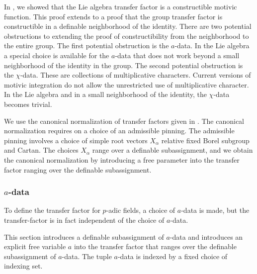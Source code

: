 In \cite{gordon}, we showed that the Lie algebra transfer factor is a constructible motivic function.  This proof extends to a proof
that the group transfer factor is constructible in a definable neighborhood of the identity.  There are two potential obstructions to
extending the proof of constructibility from
the neighborhood to the entire group.  The first potential obstruction is the $a$-data.  In the Lie algebra a special choice is available
for the $a$-data that does not work beyond a small neighborhood of the identity in the group.   The second potential obstruction is 
the $\chi$-data.  These are collections of multiplicative characters.  Current versions of motivic integration do not allow the unrestricted
use of multiplicative character.  In the Lie algebra and in a small neighborhood of the identity, the $\chi$-data becomes trivial.

We use the canonical normalization of transfer factors given in \cite[\S7]{hales1993simple}.  The canonical normalization requires
on a choice of an admissible pinning.  The admissible pinning involves a choice of simple root vectors $X_\alpha$ relative fixed Borel subgroup and Cartan.
The choices $X_\alpha$ range over a definable subassignment, and we obtain the canonical normalization by introducing a free
parameter into the transfer factor ranging over the definable subassignment.

\subsubsection{$a$-data}

To define the transfer factor for $p$-adic  fields, a choice of $a$-data is made, but the transfer-factor is in fact independent of the choice of $a$-data.

This section introduces a definable subassignment of $a$-data and introduces an explicit free variable $a$ into the transfer factor that ranges over
the definable subassignment of $a$-data.  The tuple $a$-data is indexed by a fixed choice of indexing set.  

